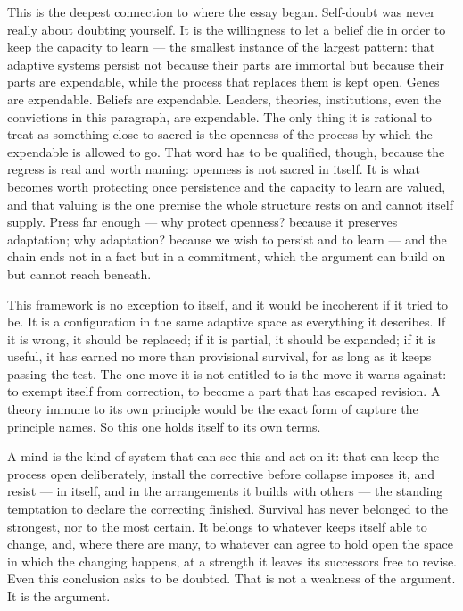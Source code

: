 \documentclass[11pt, a4paper]{report}
\begin{document}
This is the deepest connection to where the essay began. Self-doubt was never really about doubting yourself. It is the willingness to let a belief die in order to keep the capacity to learn --- the smallest instance of the largest pattern: that adaptive systems persist not because their parts are immortal but because their parts are expendable, while the process that replaces them is kept open. Genes are expendable. Beliefs are expendable. Leaders, theories, institutions, even the convictions in this paragraph, are expendable. The only thing it is rational to treat as something close to sacred is the openness of the process by which the expendable is allowed to go. That word has to be qualified, though, because the regress is real and worth naming: openness is not sacred in itself. It is what becomes worth protecting once persistence and the capacity to learn are valued, and that valuing is the one premise the whole structure rests on and cannot itself supply. Press far enough --- why protect openness? because it preserves adaptation; why adaptation? because we wish to persist and to learn --- and the chain ends not in a fact but in a commitment, which the argument can build on but cannot reach beneath.

This framework is no exception to itself, and it would be incoherent if it tried to be. It is a configuration in the same adaptive space as everything it describes. If it is wrong, it should be replaced; if it is partial, it should be expanded; if it is useful, it has earned no more than provisional survival, for as long as it keeps passing the test. The one move it is not entitled to is the move it warns against: to exempt itself from correction, to become a part that has escaped revision. A theory immune to its own principle would be the exact form of capture the principle names. So this one holds itself to its own terms.

A mind is the kind of system that can see this and act on it: that can keep the process open deliberately, install the corrective before collapse imposes it, and resist --- in itself, and in the arrangements it builds with others --- the standing temptation to declare the correcting finished. Survival has never belonged to the strongest, nor to the most certain. It belongs to whatever keeps itself able to change, and, where there are many, to whatever can agree to hold open the space in which the changing happens, at a strength it leaves its successors free to revise. Even this conclusion asks to be doubted. That is not a weakness of the argument. It is the argument.
\end{document}
